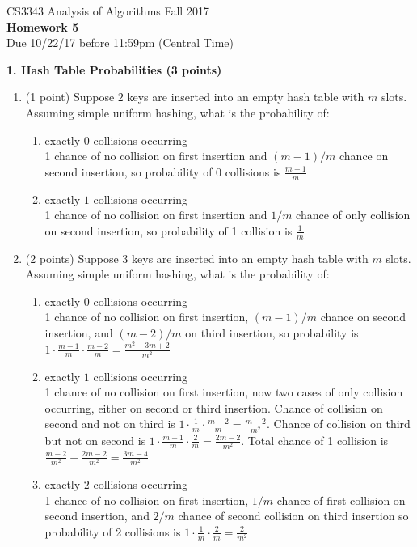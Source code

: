 \documentclass[12pt]{elsart}
\begin{document}
\pagestyle{empty}

\begin{center}
\Large  CS3343 Analysis of Algorithms Fall 2017 \\
\large {\bf Homework 5}\\
\normalsize Due 10/22/17 before 11:59pm (Central Time)
\end{center}

{\bf 1.  Hash Table Probabilities (3 points)}

\begin{enumerate}
   \item (1 point) Suppose $2$ keys are inserted into an empty hash table with $m$ slots. Assuming
simple uniform hashing, what is the probability of:
\begin{enumerate}
   \item exactly $0$ collisions occurring\\
      1 chance of no collision on first insertion and $(m - 1) / m$ chance on second insertion, so probability of 0 collisions is $\frac{m - 1}{m}$
   \item exactly $1$ collisions occurring\\
      1 chance of no collision on first insertion and $1 / m$ chance of only collision on second insertion, so probability of 1 collision is $\frac{1}{m}$\\
\end{enumerate}

   \item (2 points) Suppose $3$ keys are inserted into an empty hash table with $m$ slots. Assuming
simple uniform hashing, what is the probability of:
\begin{enumerate}
   \item exactly $0$ collisions occurring\\
      1 chance of no collision on first insertion, $(m - 1) / m$ chance on second insertion, and $(m - 2) / m$ on third insertion, so probability is $1 \cdot \frac{m - 1}{m} \cdot \frac{m - 2}{m} = \frac{m^2 - 3m + 2}{m^2}$
   \item exactly $1$ collisions occurring\\
      1 chance of no collision on first insertion, now two cases of only collision occurring, either on second or third insertion. Chance of collision on second and not on third is $1 \cdot \frac{1}{m} \cdot \frac{m - 2}{m} = \frac{m - 2}{m^2}$. Chance of collision on third but not on second is $1 \cdot \frac{m - 1}{m} \cdot \frac{2}{m} = \frac{2m - 2}{m^2}$. Total chance of 1 collision is $\frac{m - 2}{m^2} + \frac{2m - 2}{m^2} = \frac{3m - 4}{m^2}$
   \item exactly $2$ collisions occurring\\
      1 chance of no collision on first insertion, $1 / m$ chance of first collision on second insertion, and $2 / m$ chance of second collision on third insertion so probability of 2 collisions is $1 \cdot \frac{1}{m} \cdot \frac{2}{m} = \frac{2}{m^2}$
      
\end{enumerate}

\end{enumerate}
\end{document}
